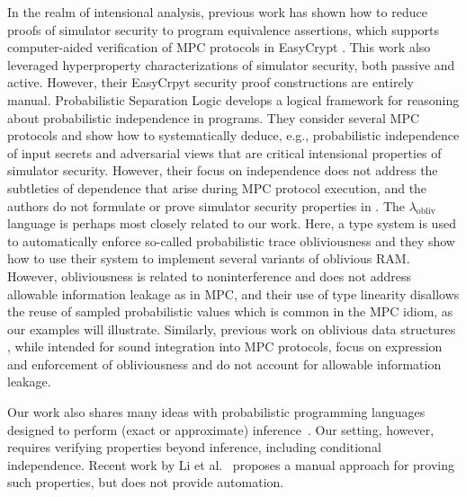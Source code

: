 In the realm of intensional analysis, previous work has shown how to
reduce proofs of simulator security to program equivalence assertions,
which supports computer-aided verification of MPC protocols in
EasyCrypt \cite{8429300}. This work also leveraged hyperproperty
characterizations of simulator security, both passive and
active. However, their EasyCrpyt security proof constructions are
entirely manual. Probabilistic Separation Logic
\cite{barthe2019probabilistic} develops a logical framework for
reasoning about probabilistic independence in programs.  They consider
several MPC protocols and show how to systematically deduce, e.g.,
probabilistic independence of input secrets and adversarial views that
are critical intensional properties of simulator security.  However,
their focus on independence does not address the subtleties of
dependence that arise during MPC protocol execution, and the authors
do not formulate or prove simulator security properties in
\cite{barthe2019probabilistic}. The $\lambda_{\mathrm{obliv}}$
language \cite{darais2019language} is perhaps most closely related to
our work. Here, a type system is used to automatically enforce
so-called probabilistic trace obliviousness and they show how to use
their system to implement several variants of oblivious RAM. However,
obliviousness is related to noninterference and does not address
allowable information leakage as in MPC, and their use of type
linearity disallows the reuse of sampled probabilistic values which is
common in the MPC idiom, as our examples will illustrate. Similarly,
previous work on oblivious data structures \cite{10.1145/3498713},
while intended for sound integration into MPC protocols, focus on
expression and enforcement of obliviousness and do not account for
allowable information leakage.

Our work also shares many ideas with probabilistic programming
languages designed to perform (exact or approximate)
inference~\cite{holtzen2020scaling, carpenter2017stan, wood2014new,
  bingham2019pyro, albarghouthi2017fairsquare, de2007problog,
  pfeffer2009figaro, saad2021sppl}. Our setting, however, requires
verifying properties beyond inference, including conditional
independence. Recent work by Li et al.~\cite{li2023lilac} proposes a
manual approach for proving such properties, but does not provide
automation.

